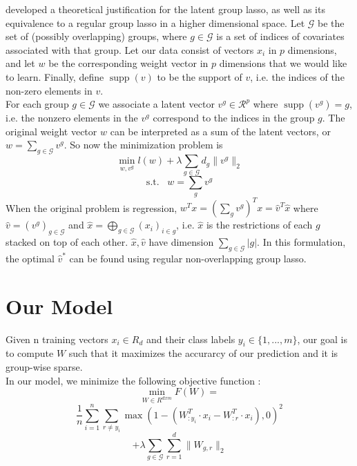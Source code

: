 \documentclass[11pt]{article}
\begin{document}
\cite{obozinski2011group} developed a theoretical justification for the latent group lasso, as well
as its equivalence to a regular group lasso in a higher dimensional space.
Let $\mathcal{G}$ be the set of (possibly overlapping) groups,
where $g \in \mathcal{G}$ is a set of indices of covariates associated with 
that group. 
Let our
data consist of vectors $x_i$ in $p$ dimensions, and let $w$ be the 
corresponding weight vector in $p$ dimensions that we would like to learn.
Finally, define $\operatorname{supp}(v)$ to be the support of $v$, i.e.
the indices of the non-zero elements in $v$.\\

For each group
$g \in \mathcal{G}$ we associate a latent vector $v^g \in \mathcal{R}^p$ where
$\operatorname{supp}(v^g) = g$, i.e. the nonzero elements in the $v^g$ correspond
to the indices in the group $g$. 
The original weight vector $w$ can be
interpreted as a sum of the latent vectors, or
$w = \sum_{g \in \mathcal{G}} v^g$. 
So now the minimization problem is
$$ \min_{w, v^g} l(w) + \lambda \sum_{g \in \mathcal{G}} d_g \|v^g \|_2 $$
$$\mathrm{s.t.}\;\;\; w = \sum_g v^g$$ 
When the original problem is regression, 
$w^Tx = \left(\sum_g v^g\right)^Tx = \hat{v}^T \hat{x}$ where 
$\hat{v} = (v^{g})_{g \in \mathcal{G}}$ and
$\hat{x} = \bigoplus_{g \in \mathcal{G} } (x_i)_{i \in g}$, i.e. $\hat{x}$ is
the restrictions of each $g$ stacked on top of each other. $\hat{x}, \hat{v}$ 
have dimension $\sum_{g \in \mathcal{G}} |g|$.
In this formulation, the optimal $\hat{v}^*$ can be found using regular 
non-overlapping group lasso. 



\section{Our Model}

Given n training vectors $x_i \in R_d$ and their class labels $y_i \in \{1, ..., m\}$, our goal is to compute $W$ such that it maximizes the accurarcy of our prediction and it is group-wise sparse. \\

In our model, we minimize the following objective function : \\

$$ \min_{W \in R^{d x m}} F(W) = $$
$$\frac{1}{n} \sum_{i=1}^{n} \sum_{r \neq y_i } \max(1 - ( W_{:y_i}^T \cdot x_i - W_{:r}^T \cdot x_i) , 0 )^2 $$
$$ + \lambda \sum_{g \in \mathcal{G}} \sum_{r=1}^{d} \| W_{g,r} \|_2$$ \\
\end{document}
